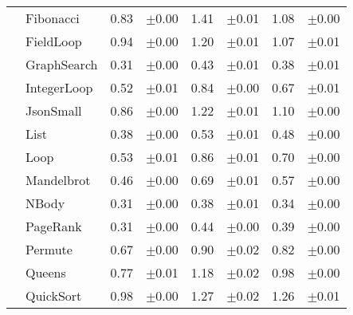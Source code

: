 \begin{tabular}{llrlrlrl}
 & Fibonacci & 0.83 & \scriptsize\textcolor{gray!60}{$\pm$0.00} & 1.41 & \scriptsize\textcolor{gray!60}{$\pm$0.01} & 1.08 & \scriptsize\textcolor{gray!60}{$\pm$0.00} \\
 & FieldLoop & 0.94 & \scriptsize\textcolor{gray!60}{$\pm$0.00} & 1.20 & \scriptsize\textcolor{gray!60}{$\pm$0.01} & 1.07 & \scriptsize\textcolor{gray!60}{$\pm$0.01} \\
 & GraphSearch & 0.31 & \scriptsize\textcolor{gray!60}{$\pm$0.00} & 0.43 & \scriptsize\textcolor{gray!60}{$\pm$0.01} & 0.38 & \scriptsize\textcolor{gray!60}{$\pm$0.01} \\
 & IntegerLoop & 0.52 & \scriptsize\textcolor{gray!60}{$\pm$0.01} & 0.84 & \scriptsize\textcolor{gray!60}{$\pm$0.00} & 0.67 & \scriptsize\textcolor{gray!60}{$\pm$0.01} \\
 & JsonSmall & 0.86 & \scriptsize\textcolor{gray!60}{$\pm$0.00} & 1.22 & \scriptsize\textcolor{gray!60}{$\pm$0.01} & 1.10 & \scriptsize\textcolor{gray!60}{$\pm$0.00} \\
 & List & 0.38 & \scriptsize\textcolor{gray!60}{$\pm$0.00} & 0.53 & \scriptsize\textcolor{gray!60}{$\pm$0.01} & 0.48 & \scriptsize\textcolor{gray!60}{$\pm$0.00} \\
 & Loop & 0.53 & \scriptsize\textcolor{gray!60}{$\pm$0.01} & 0.86 & \scriptsize\textcolor{gray!60}{$\pm$0.01} & 0.70 & \scriptsize\textcolor{gray!60}{$\pm$0.00} \\
 & Mandelbrot & 0.46 & \scriptsize\textcolor{gray!60}{$\pm$0.00} & 0.69 & \scriptsize\textcolor{gray!60}{$\pm$0.01} & 0.57 & \scriptsize\textcolor{gray!60}{$\pm$0.00} \\
 & NBody & 0.31 & \scriptsize\textcolor{gray!60}{$\pm$0.00} & 0.38 & \scriptsize\textcolor{gray!60}{$\pm$0.01} & 0.34 & \scriptsize\textcolor{gray!60}{$\pm$0.00} \\
 & PageRank & 0.31 & \scriptsize\textcolor{gray!60}{$\pm$0.00} & 0.44 & \scriptsize\textcolor{gray!60}{$\pm$0.00} & 0.39 & \scriptsize\textcolor{gray!60}{$\pm$0.00} \\
 & Permute & 0.67 & \scriptsize\textcolor{gray!60}{$\pm$0.00} & 0.90 & \scriptsize\textcolor{gray!60}{$\pm$0.02} & 0.82 & \scriptsize\textcolor{gray!60}{$\pm$0.00} \\
 & Queens & 0.77 & \scriptsize\textcolor{gray!60}{$\pm$0.01} & 1.18 & \scriptsize\textcolor{gray!60}{$\pm$0.02} & 0.98 & \scriptsize\textcolor{gray!60}{$\pm$0.00} \\
 & QuickSort & 0.98 & \scriptsize\textcolor{gray!60}{$\pm$0.00} & 1.27 & \scriptsize\textcolor{gray!60}{$\pm$0.02} & 1.26 & \scriptsize\textcolor{gray!60}{$\pm$0.01} \\

\end{tabular}
